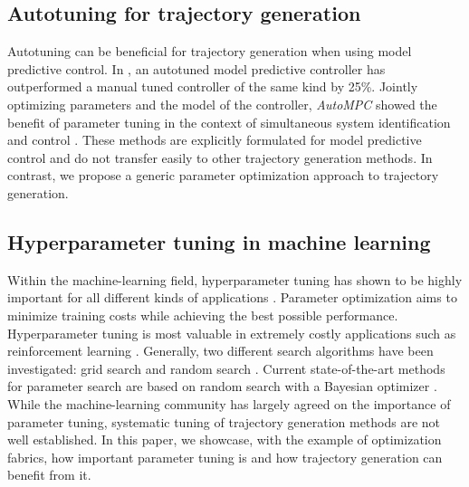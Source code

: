 \subsection{Autotuning for trajectory generation}
%
Autotuning can be beneficial for trajectory generation when using model predictive control.
In \cite{loquercio_autotune_2022}, an autotuned
model predictive controller has outperformed a manual tuned controller of the same kind by 
25\%. Jointly optimizing parameters and the model of the controller, \textit{AutoMPC} 
showed the benefit of parameter tuning in the context of simultaneous system
identification and control \cite{edwards_automatic_2021}. These methods are explicitly 
formulated for model predictive control and do not transfer easily to other trajectory generation
methods. In contrast, we propose a generic parameter optimization approach to trajectory generation.

\subsection{Hyperparameter tuning in machine learning}
%
Within the machine-learning field, hyperparameter tuning has shown to be highly 
important for all different kinds of applications \cite{yang2020hyperparameter,hutter_automated_2019,optuna}. 
Parameter optimization aims to minimize 
training costs while achieving the best possible performance. Hyperparameter tuning 
is most valuable in extremely
costly applications such as reinforcement learning \cite{zoph_neural_2017}. Generally, two different search
algorithms have been investigated: grid search and random search \cite{bergstra_random_nodate}.
Current state-of-the-art methods for parameter search are based on 
random search with a Bayesian optimizer \cite{optuna,bergstra_algorithms_nodate}.
While the machine-learning community has largely agreed on the importance of
parameter tuning, systematic tuning of trajectory generation methods are not well established. 
In this paper, we showcase, with the example of optimization fabrics, how important 
parameter tuning is and how trajectory generation can benefit from it.
